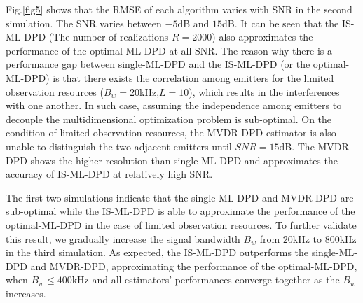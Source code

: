 \documentclass[review]{elsarticle}
\begin{document}
Fig.\ref{fig5} shows that the RMSE of each algorithm varies with SNR in the second simulation. The SNR varies between $-5$dB and $15$dB. It can be seen that the IS-ML-DPD (The number of realizations $R=2000$) also approximates the performance of the optimal-ML-DPD at all SNR. The reason why there is a performance gap between single-ML-DPD and the IS-ML-DPD (or the optimal-ML-DPD) is that there exists the correlation among emitters for the limited observation resources ($B_w=20$kHz,$L=10$), which results in the interferences with one another. In such case, assuming the independence among emitters to decouple the multidimensional optimization problem is sub-optimal. On the condition of limited observation resources, the MVDR-DPD estimator is also unable to distinguish the two adjacent emitters until $SNR= 15$dB. The MVDR-DPD shows the higher resolution than single-ML-DPD and approximates the accuracy of IS-ML-DPD at relatively high SNR.

The first two simulations indicate that the single-ML-DPD and MVDR-DPD are sub-optimal while the IS-ML-DPD is able to approximate the performance of the optimal-ML-DPD in the case of limited observation resources. To further validate this result, we gradually increase the signal bandwidth $B_w$ from $20$kHz to $800$kHz in the third simulation. As expected, the IS-ML-DPD outperforms the single-ML-DPD and MVDR-DPD, approximating the performance of the optimal-ML-DPD, when $B_w\leq400$kHz and all estimators' performances converge together as the $B_w$ increases.

\appendix
\end{document}

